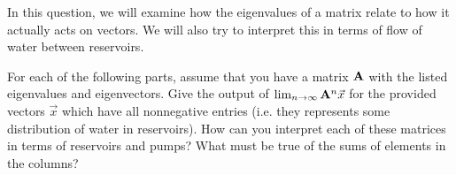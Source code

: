 

In this question, we will examine how the eigenvalues of a matrix relate to how it actually acts on vectors. We will also try to interpret this in terms of flow of water between reservoirs.

For each of the following parts, assume that you have a matrix $\mathbf{A}$ with the listed eigenvalues and eigenvectors. Give the output of $\lim_{n \to \infty} \mathbf{A}^n \vec{x}$ for the provided vectors $\vec{x}$ which have all nonnegative entries (i.e. they represents some distribution of water in reservoirs). How can you interpret each of these matrices in terms of reservoirs and pumps? What must be true of the sums of elements in the columns?


